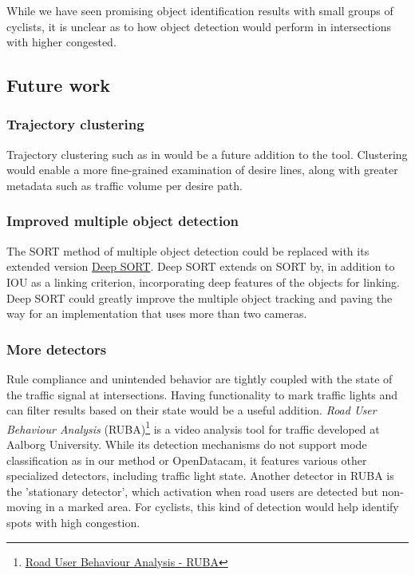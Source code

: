 While we have seen promising object identification results with small groups
of cyclists, it is unclear as to how object detection would perform in intersections with higher congested. 
\ \\

\subsection{Future work}
\subsubsection{Trajectory clustering}
Trajectory clustering such as in \cite{gariel_trajectory_2011} would be a future addition to the tool.
Clustering would enable a more fine-grained examination of desire lines,
along with greater metadata such as traffic volume per desire path.

\subsubsection{Improved multiple object detection}
The SORT method of multiple object detection could be replaced with its extended version \href{https://github.com/nwojke/deep_sort}{Deep SORT}.
Deep SORT extends on SORT by, in addition to IOU as a linking criterion, incorporating
deep features of the objects for linking. Deep SORT could greatly improve the multiple object tracking
and paving the way for an implementation that uses more than two cameras.

\subsubsection{More detectors}
Rule compliance and unintended behavior are tightly coupled with the state of the traffic signal at intersections. 
Having functionality to mark traffic lights and can filter results based on their state would be a useful addition. 
\textit{Road User Behaviour Analysis} (RUBA)\footnote{\href{https://vbn.aau.dk/en/publications/the-ruba-watchdog-video-analysis-tool}{Road User Behaviour Analysis - RUBA}} 
is a video analysis tool for traffic developed at Aalborg University. While its detection mechanisms do not support mode classification
as in our method or OpenDatacam, it features various other specialized detectors, including traffic light state. 
Another detector in RUBA is the 'stationary detector', which activation when road users are detected but non-moving in a marked area. 
For cyclists, this kind of detection would help identify spots with high congestion.